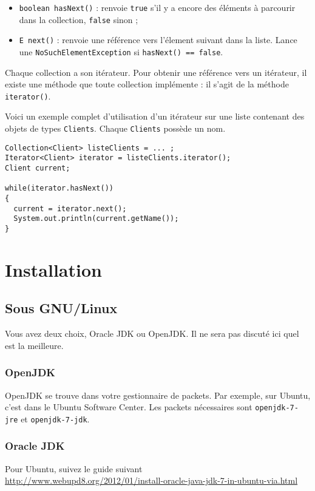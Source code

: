 \begin{itemize}
\item \lstinline{boolean hasNext()} : renvoie \lstinline|true| s'il y a encore des
éléments à parcourir dans la collection, \lstinline|false| sinon ;
\item \lstinline|E next()| : renvoie une référence vers l'élement suivant dans la liste.
Lance une \lstinline|NoSuchElementException| si \lstinline|hasNext() == false|.
\end{itemize}

Chaque collection a son itérateur. Pour obtenir une référence vers un itérateur, il existe 
une méthode que toute collection implémente : il s'agit de la méthode \lstinline|iterator()|.

Voici un exemple complet d'utilisation d'un itérateur sur une liste contenant
des objets de types \lstinline|Clients|. Chaque \lstinline|Clients| possède un nom.

\begin{lstlisting}
Collection<Client> listeClients = ... ;
Iterator<Client> iterator = listeClients.iterator(); 
Client current;

while(iterator.hasNext())
{
  current = iterator.next();
  System.out.println(current.getName());
}
\end{lstlisting}

\annexe
\section{Installation}
\subsection{Sous GNU/Linux}
Vous avez deux choix, Oracle JDK ou OpenJDK.
Il ne sera pas discuté ici quel est la meilleure.

\subsubsection{OpenJDK}
OpenJDK se trouve dans votre gestionnaire de packets.
Par exemple, sur Ubuntu, c'est dans le Ubuntu Software Center.
Les packets nécessaires sont \lstinline|openjdk-7-jre| et
\lstinline|openjdk-7-jdk|.

\subsubsection{Oracle JDK}
Pour Ubuntu, suivez le guide suivant\\
\url{http://www.webupd8.org/2012/01/install-oracle-java-jdk-7-in-ubuntu-via.html}


